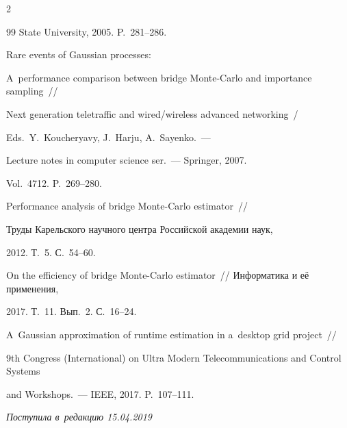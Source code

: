 \begin{multicols}{2}
{{\begin{thebibliography}{99}
State University, 2005. P.~281--286.


 Rare events of Gaussian processes: 

A~performance comparison between bridge Monte-Carlo and importance sampling~// 

Next generation teletraffic and wired/wireless advanced networking~/

 Eds.\ Y.~Koucheryavy, J.~Harju, A.~Sayenko.~--- 

 Lecture notes in computer science ser.~--- Springer, 2007.

Vol.~4712. P.~269--280.



Performance analysis of bridge Monte-Carlo estimator~// 

Труды Карельского научного центра Российской академии наук, 

2012. Т.~5. С.~54--60.



 On the efficiency of bridge Monte-Carlo estimator~// Информатика и её применения,

  2017.  Т.~11. Вып.~2. С.~16--24.





A~Gaussian approximation of runtime estimation in a~desktop grid project~// 

9th  Congress (International) on Ultra Modern Telecommunications and Control Systems 

and Workshops.~--- IEEE, 2017. P.~107--111.



\end{thebibliography}

} }



\end{multicols}



 \label{end\stat}



 \vspace*{-9pt}



\hfill{\small\textit{Поступила в~редакцию 15.04.2019}}






\renewcommand{\figurename}{\protect\bf Рис.}

\renewcommand{\tablename}{\protect\bf Таблица}

